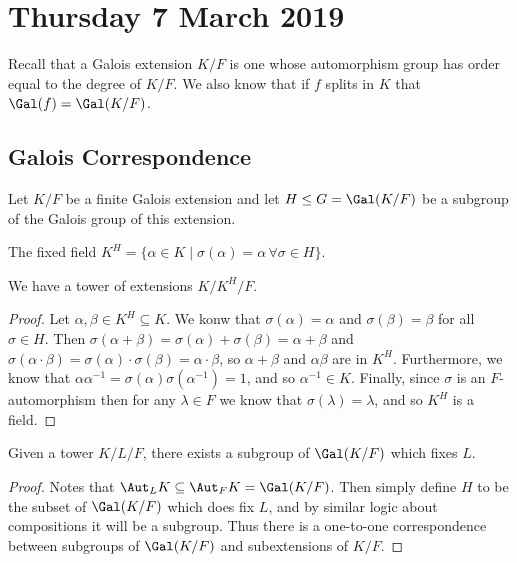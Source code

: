 
\section{Thursday 7 March 2019}

Recall that a Galois extension $K/F$ is one whose automorphism group has order equal to the degree of $K/F$. We also know that if $f$ splits in $K$ that $\Gal(f) = \Gal(K/F)$.

\subsection{Galois Correspondence}

Let $K/F$ be a finite Galois extension and let $H \leq G = \Gal(K/F)$ be a subgroup of the Galois group of this extension.

\begin{definition}
The fixed field $K^H = \{\alpha \in K \mid \sigma(\alpha) = \alpha\, \forall\sigma \in H\}$.
\end{definition}

\begin{claim}
We have a tower of extensions $K/K^H/F$.
\end{claim}

\begin{proof}
Let $\alpha,\beta \in K^H \subseteq K$. We konw that $\sigma(\alpha) = \alpha$ and $\sigma(\beta) = \beta$ for all $\sigma \in H$. Then $\sigma(\alpha + \beta) = \sigma(\alpha) + \sigma(\beta) = \alpha + \beta$ and $\sigma(\alpha \cdot \beta) = \sigma(\alpha) \cdot \sigma(\beta) = \alpha \cdot \beta$, so $\alpha + \beta$ and $\alpha\beta$ are in $K^H$. Furthermore, we know that $\alpha\alpha^{-1} = \sigma(\alpha)\sigma(\alpha^{-1}) = 1$, and so $\alpha^{-1} \in K$. Finally, since $\sigma$ is an $F$-automorphism then for any $\lambda \in F$ we know that $\sigma(\lambda) = \lambda$, and so $K^H$ is a field.
\end{proof}

\begin{claim}
Given a tower $K/L/F$, there exists a subgroup of $\Gal(K/F)$ which fixes $L$.
\end{claim}

\begin{proof}
Notes that $\Aut_L K \subseteq \Aut_F K = \Gal(K/F)$. Then simply define $H$ to be the subset of $\Gal(K/F)$ which does fix $L$, and by similar logic about compositions it will be a subgroup. Thus there is a one-to-one correspondence between subgroups of $\Gal(K/F)$ and subextensions of $K/F$.
\end{proof}


